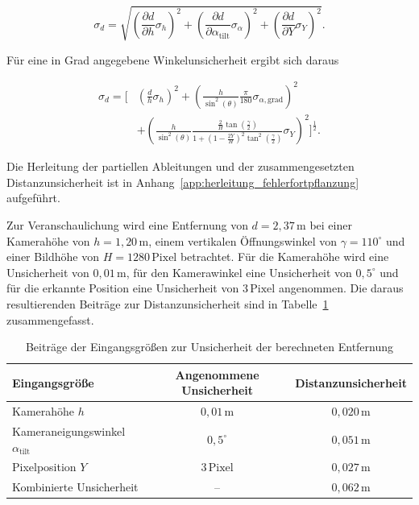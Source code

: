 \begin{equation} 
    \sigma_d = \sqrt{ \left( \frac{\partial d}{\partial h}\sigma_h \right)^2 + \left( \frac{\partial d}{\partial \alpha_{\mathrm{tilt}}} \sigma_{\alpha} \right)^2 + \left( \frac{\partial d}{\partial Y}\sigma_Y \right)^2 }. 
    \label{eq:gauss_allgemein} 
\end{equation} 

Für eine in Grad angegebene Winkelunsicherheit ergibt sich daraus 

\begin{equation} 
    \begin{split} 
        \sigma_d = \Bigg[ &\left( \frac{d}{h}\sigma_h \right)^2 + \left( \frac{h}{\sin^2(\theta)} \frac{\pi}{180} \sigma_{\alpha,\mathrm{grad}} \right)^2 \\[0.5em] &+ \left( \frac{h}{\sin^2(\theta)} \frac{ \frac{2}{H}\tan\left(\frac{\gamma}{2}\right) }
        { 1+ \left(1-\frac{2Y}{H}\right)^2 \tan^2\left(\frac{\gamma}{2}\right) } \sigma_Y \right)^2 \Bigg]^{\frac{1}{2}}. 
        \label{eq:distanzunsicherheit} 
    \end{split} 
\end{equation} 

Die Herleitung der partiellen Ableitungen und der zusammengesetzten Distanzunsicherheit ist in Anhang~\ref{app:herleitung_fehlerfortpflanzung} aufgeführt. 

Zur Veranschaulichung wird eine Entfernung von \(d = 2{,}37\,\mathrm{m}\) bei einer Kamerahöhe von \(h = 1{,}20\,\mathrm{m}\), einem vertikalen Öffnungswinkel von \(\gamma = 110^\circ\) und einer Bildhöhe von \(H = 1280\,\mathrm{Pixel}\) betrachtet. Für die Kamerahöhe wird eine Unsicherheit von \(0{,}01\,\mathrm{m}\), 
für den Kamerawinkel eine Unsicherheit von \(0{,}5^\circ\) und für die erkannte Position eine Unsicherheit von \(3\,\mathrm{Pixel}\) angenommen. Die daraus resultierenden Beiträge zur Distanzunsicherheit sind in Tabelle~\ref{tab:fehlerfortpflanzung_entfernung} zusammengefasst. 

\begin{table}[htbp] 
    \centering 
    \begin{tabular}{|l|c|c|} 
        \hline 
        \textbf{Eingangsgröße} & \textbf{Angenommene Unsicherheit} & \textbf{Distanzunsicherheit} \\ 
        \hline 
        Kamerahöhe \(h\) & \(0{,}01\,\mathrm{m}\) & \(0{,}020\,\mathrm{m}\) \\ 
        Kameraneigungswinkel \(\alpha_{\mathrm{tilt}}\) & \(0{,}5^\circ\) & \(0{,}051\,\mathrm{m}\) \\ 
        Pixelposition \(Y\) & \(3\,\mathrm{Pixel}\) & \(0{,}027\,\mathrm{m}\) \\ 
        \hline 
        Kombinierte Unsicherheit & -- & \(0{,}062\,\mathrm{m}\) \\ 
        \hline 
    \end{tabular} 
    \caption{Beiträge der Eingangsgrößen zur Unsicherheit der berechneten Entfernung} 
    \label{tab:fehlerfortpflanzung_entfernung} 
\end{table} 

